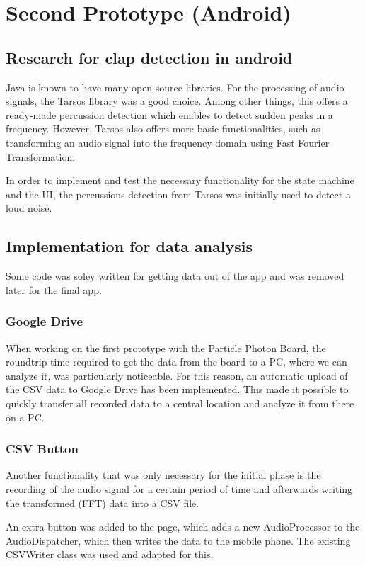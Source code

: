 \chapter{Second Prototype (Android)}
\label{sec:org11f3563}

\section{Research for clap detection in android}
\label{sec:orgc78ecb4}
Java is known to have many open source libraries. For the processing of audio
signals, the Tarsos library was a good choice. Among other things, this offers a
ready-made percussion detection which enables to detect sudden peaks in a
frequency. However, Tarsos also offers more basic functionalities, such as
transforming an audio signal into the frequency domain using Fast Fourier
Transformation.

In order to implement and test the necessary functionality for the state machine
and the UI, the percussions detection from Tarsos was initially used to detect a
loud noise.

\section{Implementation for data analysis}
\label{sec:org29c2ba8}
Some code was soley written for getting data out of the app and was removed 
later for the final app.

\subsection{Google Drive}
\label{sec:orgfdfd3aa}
When working on the first prototype with the Particle Photon Board, the
roundtrip time required to get the data from the board to a PC, where we can
analyze it, was particularly noticeable. For this reason, an automatic upload of
the CSV data to Google Drive has been implemented. This made it possible to
quickly transfer all recorded data to a central location and analyze it from
there on a PC.
\subsection{CSV Button}
\label{sec:orgcc3314e}
Another functionality that was only necessary for the initial phase is the
recording of the audio signal for a certain period of time and afterwards
writing the transformed (FFT) data into a CSV file.

An extra button was added to the page, which adds a new AudioProcessor to the
AudioDispatcher, which then writes the data to the mobile phone. The existing
CSVWriter class was used and adapted for this.

